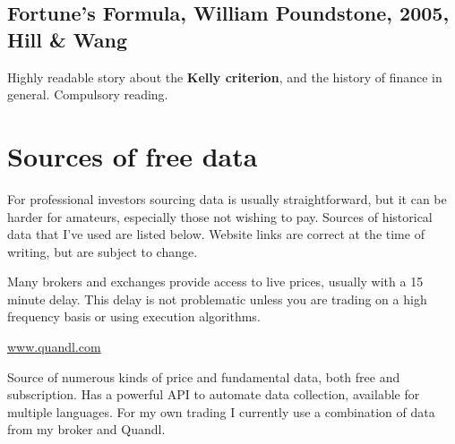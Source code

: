 \subsection*{Fortune's Formula, William Poundstone, 2005, Hill \& Wang}

Highly readable story about the \textbf{Kelly criterion}, and the history of finance in general. Compulsory reading.




\section*{Sources of free data}  {}

For professional investors sourcing data is usually straightforward, but it can be harder for amateurs, especially those not wishing to pay. Sources of historical data that I've used are listed below. Website links are correct at the time of writing, but are subject to change.

Many brokers and exchanges provide access to live prices, usually with a 15 minute delay. This delay is not problematic unless you are trading on a high frequency basis or using execution algorithms.

\url{www.quandl.com}

Source of numerous kinds of price and fundamental data, both free and subscription. Has a powerful API to automate data collection, available for multiple languages. For my own trading I currently use a combination of data from my broker and Quandl.

